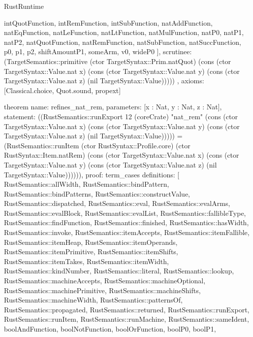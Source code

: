 \begin{lexlean}{RustRuntime}
\begin{semanticmodule}
{{      intQuotFunction,
      intRemFunction,
      intSubFunction,
      natAddFunction,
      natEqFunction,
      natLeFunction,
      natLtFunction,
      natMulFunction,
      natP0,
      natP1,
      natP2,
      natQuotFunction,
      natRemFunction,
      natSubFunction,
      natSuccFunction,
      p0,
      p1,
      p2,
      shiftAmountP1,
      someArm,
      v0,
      wideP0
    ],
    scrutinee: (TargetSemantics::primitive (ctor TargetSyntax::Prim.natQuot) (cons (ctor TargetSyntax::Value.nat x) (cons (ctor TargetSyntax::Value.nat y) (cons (ctor TargetSyntax::Value.nat z) (nil TargetSyntax::Value)))))
  },
  axioms: [Classical.choice, Quot.sound, propext]
}

theorem{
  name: refines_nat_rem,
  parameters: [x : Nat, y : Nat, z : Nat],
  statement: ((RustSemantics::runExport 12 (coreCrate) "nat_rem" (cons (ctor TargetSyntax::Value.nat x) (cons (ctor TargetSyntax::Value.nat y) (cons (ctor TargetSyntax::Value.nat z) (nil TargetSyntax::Value))))) = (RustSemantics::runItem (ctor RustSyntax::Profile.core) (ctor RustSyntax::Item.natRem) (cons (ctor TargetSyntax::Value.nat x) (cons (ctor TargetSyntax::Value.nat y) (cons (ctor TargetSyntax::Value.nat z) (nil TargetSyntax::Value)))))),
  proof: term_cases{
    definitions: [
      RustSemantics::allWidth,
      RustSemantics::bindPattern,
      RustSemantics::bindPatterns,
      RustSemantics::constructValue,
      RustSemantics::dispatched,
      RustSemantics::eval,
      RustSemantics::evalArms,
      RustSemantics::evalBlock,
      RustSemantics::evalList,
      RustSemantics::fallibleType,
      RustSemantics::findFunction,
      RustSemantics::finished,
      RustSemantics::hasWidth,
      RustSemantics::invoke,
      RustSemantics::itemAccepts,
      RustSemantics::itemFallible,
      RustSemantics::itemHeap,
      RustSemantics::itemOperands,
      RustSemantics::itemPrimitive,
      RustSemantics::itemShifts,
      RustSemantics::itemTakes,
      RustSemantics::itemWidth,
      RustSemantics::kindNumber,
      RustSemantics::literal,
      RustSemantics::lookup,
      RustSemantics::machineAccepts,
      RustSemantics::machineOptional,
      RustSemantics::machinePrimitive,
      RustSemantics::machineShifts,
      RustSemantics::machineWidth,
      RustSemantics::patternsOf,
      RustSemantics::propagated,
      RustSemantics::returned,
      RustSemantics::runExport,
      RustSemantics::runItem,
      RustSemantics::runMachine,
      RustSemantics::sameIdent,
      boolAndFunction,
      boolNotFunction,
      boolOrFunction,
      boolP0,
      boolP1,
}}
\end{semanticmodule}
\end{lexlean}
